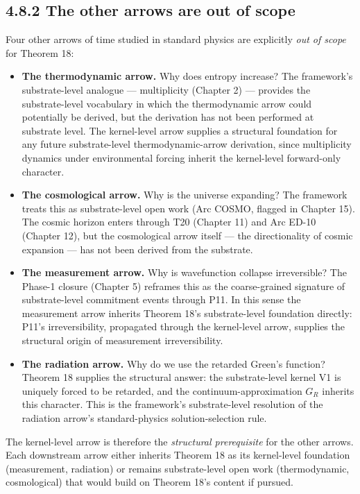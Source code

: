 \documentclass[11pt]{book}
\begin{document}
\subsection{4.8.2 The other arrows are out of scope}

Four other arrows of time studied in standard physics are explicitly \textit{out of scope} for Theorem 18:

\begin{itemize}
\item \textbf{The thermodynamic arrow.} Why does entropy increase? The framework's substrate-level analogue — multiplicity (Chapter 2) — provides the substrate-level vocabulary in which the thermodynamic arrow could potentially be derived, but the derivation has not been performed at substrate level. The kernel-level arrow supplies a structural foundation for any future substrate-level thermodynamic-arrow derivation, since multiplicity dynamics under environmental forcing inherit the kernel-level forward-only character.
\item \textbf{The cosmological arrow.} Why is the universe expanding? The framework treats this as substrate-level open work (Arc COSMO, flagged in Chapter 15). The cosmic horizon enters through T20 (Chapter 11) and Arc ED-10 (Chapter 12), but the cosmological arrow itself — the directionality of cosmic expansion — has not been derived from the substrate.
\item \textbf{The measurement arrow.} Why is wavefunction collapse irreversible? The Phase-1 closure (Chapter 5) reframes this as the coarse-grained signature of substrate-level commitment events through P11. In this sense the measurement arrow inherits Theorem 18's substrate-level foundation directly: P11's irreversibility, propagated through the kernel-level arrow, supplies the structural origin of measurement irreversibility.
\item \textbf{The radiation arrow.} Why do we use the retarded Green's function? Theorem 18 supplies the structural answer: the substrate-level kernel V1 is uniquely forced to be retarded, and the continuum-approximation $G_R$ inherits this character. This is the framework's substrate-level resolution of the radiation arrow's standard-physics solution-selection rule.
\end{itemize}

The kernel-level arrow is therefore the \textit{structural prerequisite} for the other arrows. Each downstream arrow either inherits Theorem 18 as its kernel-level foundation (measurement, radiation) or remains substrate-level open work (thermodynamic, cosmological) that would build on Theorem 18's content if pursued.
\end{document}
